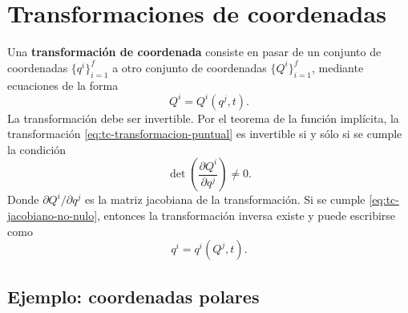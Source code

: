 \documentclass[../apunte_mecanica_clasica.tex]{subfiles}
\begin{document}
\section{Transformaciones de coordenadas}
\label{sec:tc-transformaciones-coordenadas}

Una \textbf{transformación de coordenada} consiste en pasar de un conjunto de coordenadas \(\{q^i\}_{i=1}^{f}\) a otro conjunto de coordenadas \(\{Q^i\}_{i=1}^{f}\), mediante ecuaciones de la forma
\begin{equation}
    Q^i=Q^i(q^j,t).
    \label{eq:tc-transformacion-puntual}
\end{equation}
La transformación debe ser invertible. Por el teorema de la función implícita, la transformación \eqref{eq:tc-transformacion-puntual} es invertible si y sólo si se cumple la condición
\begin{equation}
    \det\left(\frac{\partial Q^i}{\partial q^j}\right)\neq 0.
    \label{eq:tc-jacobiano-no-nulo}
\end{equation}
Donde \(\partial Q^i/\partial q^j\) es la matriz jacobiana de la transformación. Si se cumple \eqref{eq:tc-jacobiano-no-nulo}, entonces la transformación inversa existe y puede escribirse como
\begin{equation}
    q^i=q^i(Q^j,t).
    \label{eq:tc-transformacion-inversa}
\end{equation}

\subsection{Ejemplo: coordenadas polares}
\label{subsec:tc-ejemplo-polares}
\end{document}
